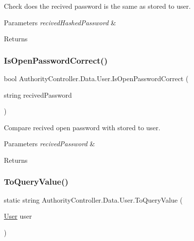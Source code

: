 Check does the recived password is the same as stored to user. 


\begin{DoxyParams}{Parameters}
{\em recived\+Hashed\+Password} & \\
\hline
\end{DoxyParams}
\begin{DoxyReturn}{Returns}

\end{DoxyReturn}
\mbox{\label{class_authority_controller_1_1_data_1_1_user_a654c513481e7cfbe36530c3cf6a908f7}} 
\subsubsection{\texorpdfstring{Is\+Open\+Password\+Correct()}{IsOpenPasswordCorrect()}}
{\footnotesize\ttfamily bool Authority\+Controller.\+Data.\+User.\+Is\+Open\+Password\+Correct (\begin{DoxyParamCaption}\item[{string}]{recived\+Password }\end{DoxyParamCaption})}



Compare recived open password with stored to user. 


\begin{DoxyParams}{Parameters}
{\em recived\+Password} & \\
\hline
\end{DoxyParams}
\begin{DoxyReturn}{Returns}

\end{DoxyReturn}
\mbox{\label{class_authority_controller_1_1_data_1_1_user_a503a867ba5d2a9a3b1ca1eec4308325c}} 
\subsubsection{\texorpdfstring{To\+Query\+Value()}{ToQueryValue()}}
{\footnotesize\ttfamily static string Authority\+Controller.\+Data.\+User.\+To\+Query\+Value (\begin{DoxyParamCaption}\item[{\mbox{\hyperlink{class_authority_controller_1_1_data_1_1_user}{User}}}]{user }\end{DoxyParamCaption})\hspace{0.3cm}{\ttfamily [static]}}



